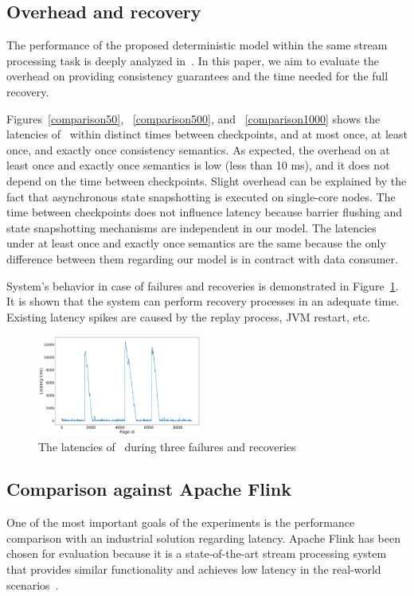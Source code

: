 \subsection{Overhead and recovery}
The performance of the proposed deterministic model within the same stream processing task is deeply analyzed in~\cite{hiddenSeim}. In this paper, we aim to evaluate the overhead on providing consistency guarantees and the time needed for the full recovery.

Figures~\ref{comparison50}, ~\ref{comparison500}, and ~\ref{comparison1000} shows the latencies of \FlameStream\ within distinct times between checkpoints, and at most once, at least once, and exactly once consistency semantics. As expected, the overhead on at least once and exactly once semantics is low (less than 10 ms), and it does not depend on the time between checkpoints. Slight overhead can be explained by the fact that asynchronous state snapshotting is executed on single-core nodes. The time between checkpoints does not influence latency because barrier flushing and state snapshotting mechanisms are independent in our model. The latencies under at least once and exactly once semantics are the same because the only difference between them regarding our model is in contract with data consumer.

System's behavior in case of failures and recoveries is demonstrated in Figure~\ref{recovery}. It is shown that the system can perform recovery processes in an adequate time. Existing latency spikes are caused by the replay process, JVM restart, etc.

\begin{figure}[htbp]
  \centering
  \includegraphics[width=0.48\textwidth]{pics/blink}
  \caption{The latencies of \FlameStream\ during three failures and recoveries}
  \label {recovery}
\end{figure}

\subsection{Comparison against Apache Flink}
One of the most important goals of the experiments is the performance comparison with an industrial solution regarding latency. Apache Flink has been chosen for evaluation because it is a state-of-the-art stream processing system that provides similar functionality and achieves low latency in the real-world scenarios~\cite{S7530084}. 

